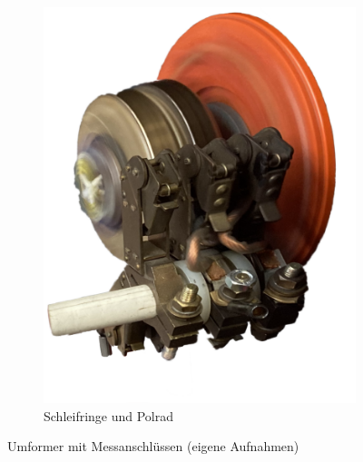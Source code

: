 \begin{figure}
\begin{subfigure}[t]{.2\textwidth}
          \includegraphics[]{Bilder/Polrad_freigestellt.png}
          \caption{Schleifringe und Polrad}
          \label{fig:Umformer_Polrad}
     \end{subfigure}\hfill%
    \caption{Umformer mit Messanschlüssen (eigene Aufnahmen)}
    \label{fig:Messaufbau}
\end{figure}

